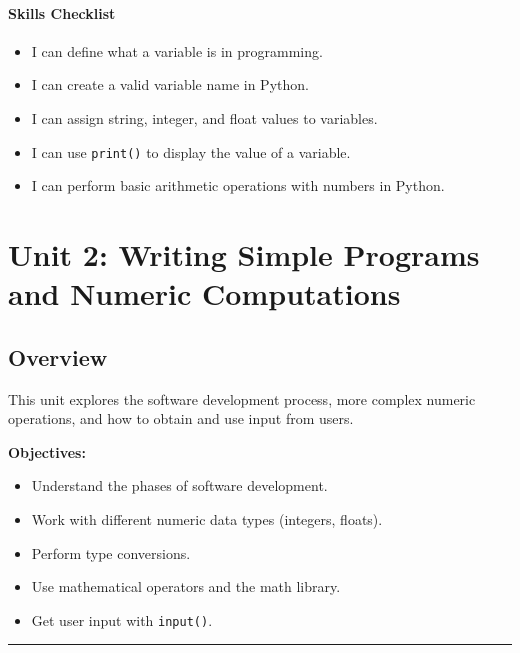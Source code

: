 \documentclass[
  justified,
  openright,
]{tufte-book}
\let\subsubsection\paragraph
\let\paragraph\paragraph
\let\subsubsection\paragraph
\let\paragraph\paragraph
\providecommand{\tightlist}{%
  \setlength{\itemsep}{0pt}\setlength{\parskip}{0pt}}
\begin{document}
\subsubsection{Skills Checklist}\label{skills-checklist-6}

\begin{itemize}
\tightlist
\item[$\square$]
  I can define what a variable is in programming.
\item[$\square$]
  I can create a valid variable name in Python.
\item[$\square$]
  I can assign string, integer, and float values to variables.
\item[$\square$]
  I can use \texttt{print()} to display the value of a variable.
\item[$\square$]
  I can perform basic arithmetic operations with numbers in Python.
\end{itemize}

\newpage

\section{Unit 2: Writing Simple Programs and Numeric
Computations}\label{unit-2-writing-simple-programs-and-numeric-computations}

\subsection{Overview}\label{overview-2}

This unit explores the software development process, more complex
numeric operations, and how to obtain and use input from users.

\textbf{Objectives:}

\begin{itemize}
\tightlist
\item
  Understand the phases of software development.
\item
  Work with different numeric data types (integers, floats).
\item
  Perform type conversions.
\item
  Use mathematical operators and the math library.
\item
  Get user input with \texttt{input()}.
\end{itemize}

\begin{center}\rule{0.5\linewidth}{0.5pt}\end{center}
\end{document}
